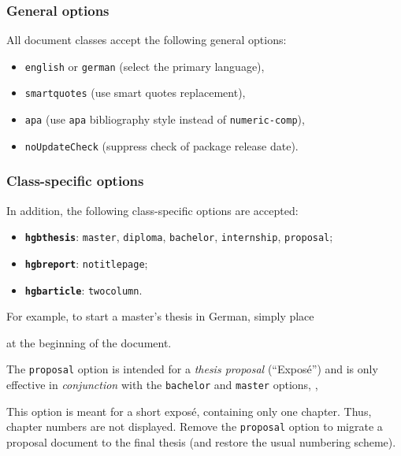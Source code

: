 \documentclass[english]{hgbarticle}
\begin{document}
\subsubsection{General options}

All document classes accept the following general options:
%
\begin{itemize}
    \item \texttt{english} or \texttt{german} (select the primary language),
    \item \texttt{smartquotes} (use smart quotes replacement),
    \item \texttt{apa} (use \texttt{apa} bibliography style instead of
    \texttt{numeric-comp}),
    \item \texttt{noUpdateCheck} (suppress check of package release date).
\end{itemize}


\subsubsection{Class-specific options}

In addition, the following class-specific options are accepted:
%
\begin{itemize}
    \item \textbf{\texttt{hgbthesis}}:
    \texttt{master}, \texttt{diploma}, \texttt{bachelor}, \texttt{internship}, \texttt{proposal};
    \item \textbf{\texttt{hgbreport}}: \texttt{notitlepage};
    \item \textbf{\texttt{hgbarticle}}: \texttt{twocolumn}.
\end{itemize}
%
For example, to start a master's thesis in German, simply place
%
%
at the beginning of the document.

The \texttt{proposal} option is intended for a \emph{thesis proposal} (``Exposé'') and is 
only effective in \emph{conjunction} with the \texttt{bachelor} and \texttt{master} 
options, \eg,
%
%
This option is meant for a short exposé, containing only one chapter. Thus,
chapter numbers are not displayed. Remove the \texttt{proposal} option to
migrate a proposal document to the final thesis (and restore the usual
numbering scheme).
\end{document}
